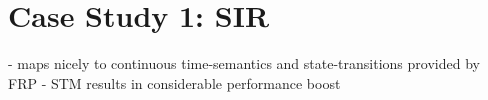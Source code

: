 \section{Case Study 1: SIR}
- maps nicely to continuous time-semantics and state-transitions provided by FRP
- STM results in considerable performance boost